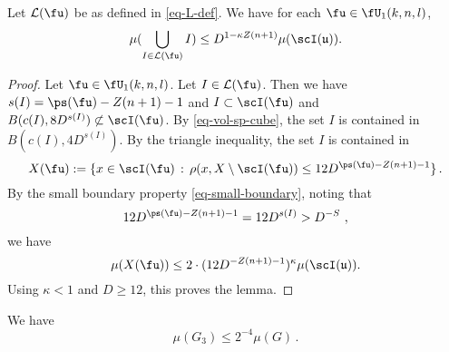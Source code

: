 \begin{lemma}
\label{boundary-exception}
\leanok
{}

Let $\mathcal{L}(\fu)$ be as defined in \eqref{eq-L-def}. We have for each $\fu\in \fU_1(k,n,l)$,
\begin{equation}
\mu(\bigcup_{I\in \mathcal{L}(\fu)} I)
\le D^{1-\kappa Z(n+1)}
        \mu(\scI(\mathfrak{u})).
\end{equation}

\end{lemma}


\begin{proof}
  Let $\fu\in \fU_1(k,n,l)$.
Let $I \in \mathcal{L}(\fu)$. Then we have $s(I) = \ps(\fu) - Z(n+1) - 1$ and $I \subset \scI(\fu)$ and $B(c(I), 8D^{s(I)}) \not \subset \scI(\fu)$.
By \eqref{eq-vol-sp-cube}, the set $I$
is contained in $B(c(I), 4D^{s(I)})$.
By the triangle inequality, the set $I$
is contained in
\begin{equation}
    X(\fu):=\{x \in \scI(\fu) \, : \, \rho(x, X \setminus \scI(\fu)) \leq 12 D^{\ps(\fu) - Z(n+1)-1}\}\,.
\end{equation}
 By the small boundary property \eqref{eq-small-boundary}, noting that
 \begin{equation*}
     12D^{\ps(\fu) - Z(n+1) - 1} = 12D^{s(I)} > D^{-S}\ ,
 \end{equation*} we have
   $$
        \mu(X(\fu)) \le
        2\cdot(12 D^{-Z(n+1)-1})^\kappa
        \mu(\scI(\mathfrak{u})).
    $$
Using $\kappa<1$ and $D \ge 12$, this proves the lemma.
\end{proof}














    \begin{lemma}
    \label{third-exception}
    \leanok
       We have
\begin{equation}
    \mu(G_3)\le 2^{-4} \mu(G)\, .
\end{equation}
    \end{lemma}



